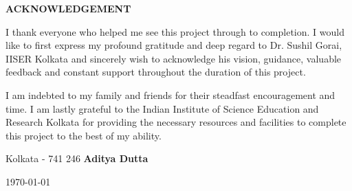 \begin{center}
{\large{\textbf{ACKNOWLEDGEMENT}}}
\end{center}


\noindent
I thank everyone who helped me see this project through to completion. I would like to first express my profound gratitude and deep regard to Dr. Sushil Gorai, IISER Kolkata and sincerely wish to acknowledge his vision, guidance, valuable feedback and constant support throughout the duration of this project.

I am indebted to my family and friends for their steadfast encouragement and time. I am lastly grateful to the Indian Institute of Science Education and Research Kolkata for providing the necessary resources and facilities to complete this project to the best of my ability.



\vspace{4cm} %

\noindent Kolkata - 741 246 \hfill \textbf{Aditya Dutta}

\noindent \today \hfill

\clearpage
